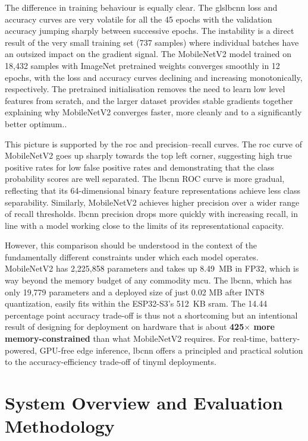 The difference in training behaviour is equally clear. The gls{lbcnn} loss and accuracy curves are very volatile for all the 45 epochs with the validation accuracy jumping sharply between successive epochs. The instability is a direct result of the very small training set (737 samples) where individual batches have an outsized impact on the gradient signal. The MobileNetV2 model trained on 18,432 samples with ImageNet pretrained weights converges smoothly in 12 epochs, with the loss and accuracy curves declining and increasing monotonically, respectively. The pretrained initialisation removes the need to learn low level features from scratch, and the larger dataset provides stable gradients together explaining why MobileNetV2 converges faster, more cleanly and to a significantly better optimum..

This picture is supported by the roc and precision–recall curves. The roc curve of MobileNetV2 goes up sharply towards the top left corner, suggesting high true positive rates for low false positive rates and demonstrating that the class probability scores are well separated. The \gls{lbcnn} ROC curve is more gradual, reflecting that its 64-dimensional binary feature representations achieve less class separability. Similarly, MobileNetV2 achieves higher precision over a wider range of recall thresholds. \gls{lbcnn} precision drops more quickly with increasing recall, in line with a model working close to the limits of its representational capacity.

However, this comparison should be understood in the context of the fundamentally different constraints under which each model operates. MobileNetV2 has 2,225,858 parameters and takes up 8.49~MB in FP32, which is way beyond the memory budget of any commodity \gls{mcu}. The \gls{lbcnn}, which has only 19,779 parameters and a deployed size of just 0.02 MB after INT8 quantization, easily fits within the ESP32-S3’s 512~KB \gls{sram}. The 14.44 percentage point accuracy trade-off is thus not a shortcoming but an intentional result of designing for deployment on hardware that is about \textbf{425$\times$ more memory-constrained} than what MobileNetV2 requires. For real-time, battery-powered, GPU-free edge inference, \gls{lbcnn} offers a principled and practical solution to the accuracy-efficiency trade-off of \gls{tinyml} deployments.

\section{System Overview and Evaluation Methodology}
 
